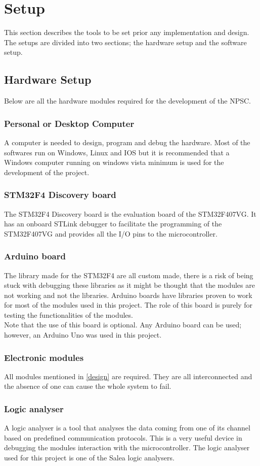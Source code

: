 \section{Setup}
This section describes the tools to be set prior any implementation and design. The setups are divided into two sections; the hardware setup and the software setup.
\subsection{Hardware Setup}
Below are all the hardware modules required for the development of the NPSC.
\subsubsection{Personal or Desktop Computer}
A computer is needed to design, program and debug the hardware. Most of the softwares run on Windows, Linux and IOS but it is recommended that a Windows computer running on windows vista minimum is used for the development of the project. 
\subsubsection{STM32F4 Discovery board}
The STM32F4 Discovery board is the evaluation board of the STM32F407VG. It has an onboard STLink debugger to facilitate the programming of the STM32F407VG and provides all the I/O pins to the microcontroller.
\subsubsection{Arduino board}
The library made for the STM32F4 are all custom made, there is a risk of being stuck with debugging these libraries as it might be thought that the modules are not working and not the libraries. Arduino boards have libraries proven to work for most of the modules used in this project. The role of this board is purely for testing the functionalities of the modules.\\
Note that the use of this board is optional. Any Arduino board can be used; however, an Arduino Uno was used in this project. 
\subsubsection{Electronic modules}
All modules mentioned in \cref{design} are required. They are all interconnected and the absence of one can cause the whole system to fail.
\subsubsection{Logic analyser}\label{logic_analyser}
A logic analyser is a tool that analyses the data coming from one of its channel based on predefined communication protocols. This is a very useful device in debugging the modules interaction with the microcontroller. The logic analyser used for this project is one of the Salea logic analysers.

